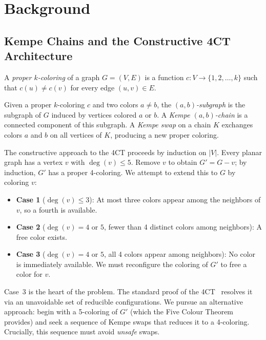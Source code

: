 
\section{Background}\label{sec:background}

\subsection{Kempe Chains and the Constructive 4CT Architecture}
\label{sec:kempe-architecture}

\begin{definition}\label{def:proper-coloring}
A \emph{proper $k$-coloring} of a graph $G = (V, E)$ is a function
$c \colon V \to \{1, 2, \ldots, k\}$ such that $c(u) \neq c(v)$ for
every edge $(u, v) \in E$.
\end{definition}

\begin{definition}\label{def:kempe-chain}
Given a proper $k$-coloring $c$ and two colors $a \neq b$, the
\emph{$(a,b)$-subgraph} is the subgraph of $G$ induced by vertices
colored $a$ or $b$. A \emph{Kempe $(a,b)$-chain} is a connected
component of this subgraph. A \emph{Kempe swap} on a chain $K$
exchanges colors $a$ and $b$ on all vertices of $K$, producing a new
proper coloring.
\end{definition}

The constructive approach to the 4CT proceeds by induction on $|V|$.
Every planar graph has a vertex $v$ with $\deg(v) \leq 5$. Remove $v$
to obtain $G' = G - v$; by induction, $G'$ has a proper 4-coloring.
We attempt to extend this to $G$ by coloring $v$:

\begin{itemize}
  \item \textbf{Case 1} ($\deg(v) \leq 3$): At most three colors appear
    among the neighbors of $v$, so a fourth is available. \checkmark
  \item \textbf{Case 2} ($\deg(v) = 4$ or $5$, fewer than 4 distinct
    colors among neighbors): A free color exists. \checkmark
  \item \textbf{Case 3} ($\deg(v) = 4$ or $5$, all 4 colors appear
    among neighbors): No color is immediately available. We must
    reconfigure the coloring of $G'$ to free a color for $v$.
\end{itemize}

Case~3 is the heart of the problem. The standard proof of the
4CT~\cite{robertson1997} resolves it via an unavoidable set of
reducible configurations. We pursue an alternative approach: begin
with a 5-coloring of $G'$ (which the Five Colour Theorem provides)
and seek a sequence of Kempe swaps that reduces it to a 4-coloring.
Crucially, this sequence must avoid \emph{unsafe} swaps.

